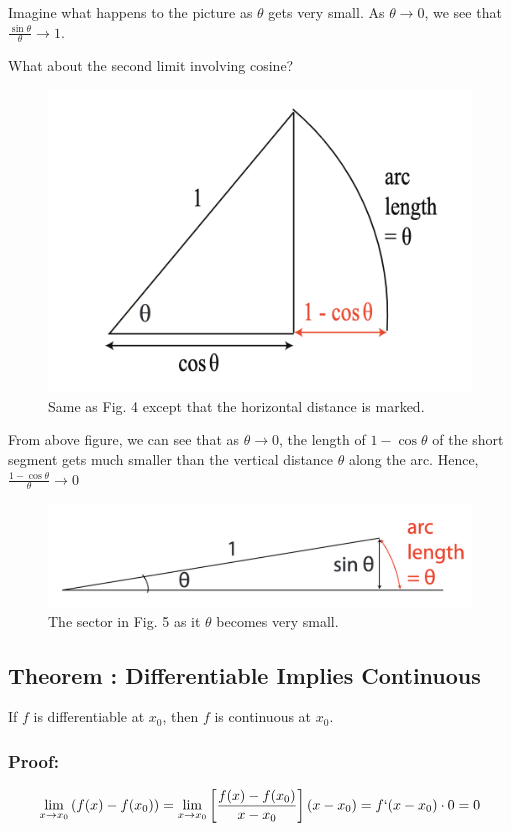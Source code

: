 Imagine what happens to the picture as $\theta$ gets very small.
As $\theta \to 0$, we see that $\frac{\sin \theta}{\theta} \to 1$.

\pagebreak

What about the second limit involving cosine?

\begin{figure}[h]
	\centering
	\includegraphics[scale=0.5]{./images/lecture_2_figure_3.png}
	\caption{Same as Fig. 4 except that the horizontal distance is marked.}    
\end{figure}


From above figure, we can see that as $\theta \to 0$, the length of $1-\cos \theta$ of the short segment gets much smaller than the vertical distance $\theta$ along the arc.
Hence, $\frac{1-\cos \theta}{\theta} \to 0$ 


\begin{figure}[h]
	\centering
	\includegraphics[scale=0.5]{./images/lecture_2_figure_4.png}
	\caption{The sector in Fig. 5 as it $\theta$ becomes very small.}    
\end{figure}

\subsection*{Theorem : Differentiable Implies Continuous}
If $f$ is differentiable at $x_0$, then $f$ is continuous at $x_0$.

\subsubsection*{Proof:} 

\begin{equation*}
\lim_{x \to x_0} \left( f(x) - f(x_0) \right)
	= \lim_{x \to x_0} \left[ \frac{f(x) - f(x_0)}{x-x_0} \right] (x - x_0) = f`(x-x_0) \cdot 0 = 0 
\end{equation*}
